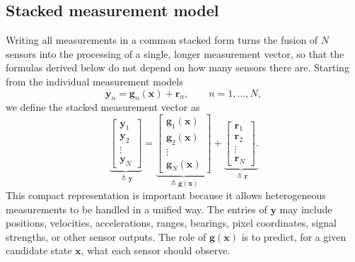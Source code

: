 \subsection{Stacked measurement model}
Writing all measurements in a common stacked form turns the fusion of $N$ sensors into the processing of a single, longer measurement vector, so that the formulas derived below do not depend on how many sensors there are. Starting from the individual measurement models
\begin{equation}
\mathbf{y}_n
=
\mathbf{g}_n(\mathbf{x})
+
\mathbf{r}_n,
\qquad n=1,\ldots,N,
\end{equation}
we define the stacked measurement vector as
\begin{equation}
\underbrace{\begin{bmatrix}
\mathbf{y}_1\\
\mathbf{y}_2\\
\vdots\\
\mathbf{y}_N
\end{bmatrix}}_{\triangleq \mathbf{y}} = 
\underbrace{\begin{bmatrix}
\mathbf{g}_1(\mathbf{x})\\
\mathbf{g}_2(\mathbf{x})\\
\vdots\\
\mathbf{g}_N(\mathbf{x})
\end{bmatrix}}_{\triangleq \mathbf{g}(\mathbf{x})} + 
\underbrace{\begin{bmatrix}
\mathbf{r}_1\\
\mathbf{r}_2\\
\vdots\\
\mathbf{r}_N
\end{bmatrix}.}_{\triangleq \mathbf{r}}
\end{equation}
This compact representation is important because it allows heterogeneous measurements to be handled in a unified way. The entries of $\mathbf{y}$ may include positions, velocities, accelerations, ranges, bearings, pixel coordinates, signal strengths, or other sensor outputs. The role of $\mathbf{g}(\mathbf{x})$ is to predict, for a given candidate state $\mathbf{x}$, what each sensor should observe.

